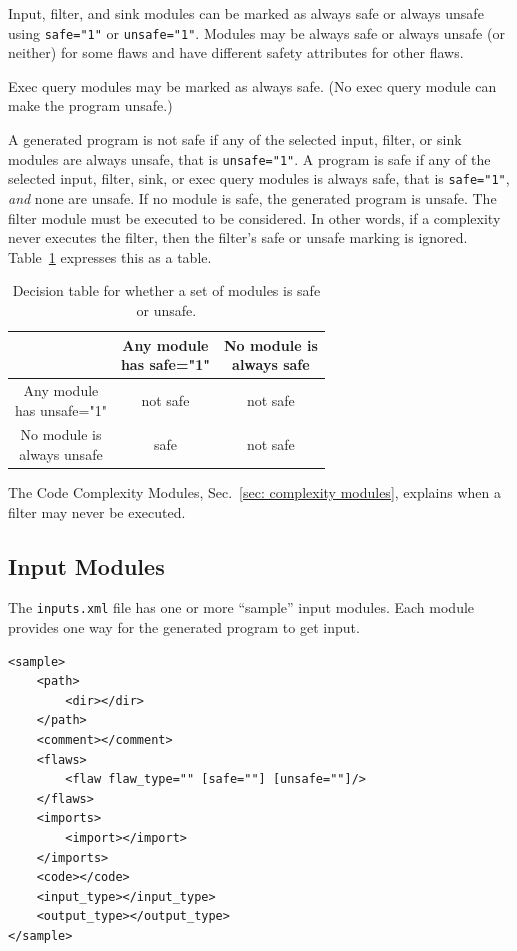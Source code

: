 \documentclass[12pt]{article}
\begin{document}
Input, filter, and sink modules can be marked as always safe or always unsafe using
\verb|safe="1"| or \verb|unsafe="1"|.  Modules may be always safe or always unsafe
(or neither) for some flaws and have different safety attributes for other
flaws.

Exec query modules may be marked as always safe.  (No exec query module can make the
program unsafe.)

A generated program is not safe if any of the selected input, filter, or sink modules
are always unsafe, that is \verb|unsafe="1"|.  A program is safe if any of the
selected input, filter, sink, or exec query modules is always safe, that is
\verb|safe="1"|, \emph{and} none
are unsafe.  If no module is safe, the generated program is unsafe.
The filter module must be executed to be considered.  In other words, if
a complexity never executes the filter, then the filter's safe or unsafe marking is
ignored.  Table~\ref{tab:selection safe algorithm} expresses this as a table.

\begin{table}[H]
\centering
\caption{Decision table for whether a set of modules is safe or unsafe.}
\begin{tabular}{c|c|c|}
  & \makecell{Any module \\ has safe="1"}
  & \makecell{No module is \\ always safe} \\
\hline
\makecell{Any module \\ has unsafe="1"}  & not safe & not safe \\
\hline
\makecell{No module is \\ always unsafe} &   safe   & not safe \\
\hline
\end{tabular}
\label{tab:selection safe algorithm}
\end{table}

The Code Complexity Modules, Sec.~\ref{sec: complexity modules}, explains when a
filter may never be executed.


\subsection{Input Modules}
\label{sec: input module}

The \verb|inputs.xml| file has one or more ``sample'' input modules.  Each module
provides one way for the generated program to get input.

\begin{verbatim}
<sample>
    <path>
        <dir></dir>
    </path>
    <comment></comment>
    <flaws>
        <flaw flaw_type="" [safe=""] [unsafe=""]/>
    </flaws>
    <imports>
        <import></import>
    </imports>
    <code></code>
    <input_type></input_type>
    <output_type></output_type>
</sample>
\end{verbatim}
\end{document}
